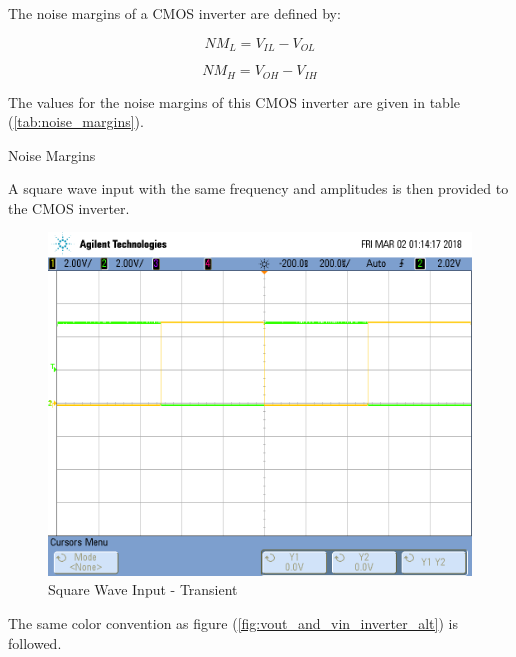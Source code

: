 The noise margins of a CMOS inverter are defined by:

\begin{equation}
	\label{eq:nml}
	NM_{L} = V_{IL} - V_{OL}
\end{equation}

\begin{equation}
	\label{eq:nmh}
	NM_{H} = V_{OH} - V_{IH}
\end{equation}

The values for the noise margins of this CMOS inverter are given in table (\ref{tab:noise_margins}).

\FloatBarrier

\begin{table}[h!]
	\centering
	\caption{Noise Margins}
	\label{tab:noise_margins}
\end{table}

\FloatBarrier

A square wave input with the same frequency and amplitudes is then provided to the CMOS inverter.

\FloatBarrier

\begin{figure}[h!]
	\centering
	\includegraphics[scale=0.30]{./images/square_wave_inverter.png}
	\caption{Square Wave Input - Transient}
	\label{fig:square_wave_inverter}
\end{figure}

\FloatBarrier

{\footnotesize The same color convention as figure (\ref{fig:vout_and_vin_inverter_alt}) is followed.}

